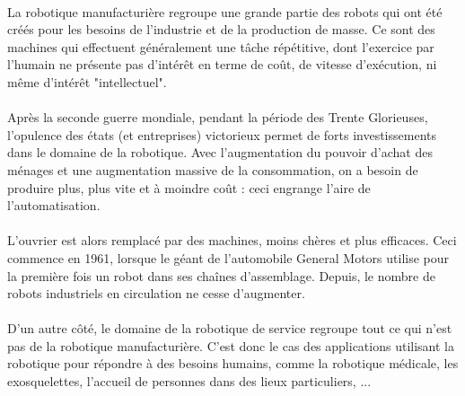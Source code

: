 \documentclass[a4paper,10pt]{article}
\begin{document}
            \paragraph{}
                La robotique manufacturière regroupe une grande partie des 
                robots qui ont été créés pour les besoins de l'industrie et de 
                la production de masse. Ce sont des machines qui effectuent 
                généralement une tâche répétitive, dont l'exercice par l'humain 
                ne présente pas d'intérêt en terme de coût, de vitesse d'exécution, 
                ni même d'intérêt "intellectuel". 
                
            \paragraph{}
                Après la seconde guerre mondiale, pendant la période des 
                Trente Glorieuses, l'opulence des états (et entreprises) victorieux
                permet de forts investissements dans le domaine de la robotique. 
                Avec l'augmentation du pouvoir d'achat des ménages et une augmentation
                massive de la consommation, on a besoin de produire plus, plus vite et 
                à moindre coût : ceci engrange l'aire de l'automatisation. 
                
            \paragraph{}
                L'ouvrier est alors remplacé par des machines, moins chères et plus efficaces.
                Ceci commence en 1961, lorsque le géant de l'automobile General Motors 
                utilise pour la première fois un robot dans ses chaînes d'assemblage.
                Depuis, le nombre de robots industriels en circulation ne cesse
                d'augmenter. 
                
            \paragraph{}
                D'un autre côté, le domaine de la robotique de service regroupe
                tout ce qui n'est pas de la robotique manufacturière. C'est donc 
                le cas des applications utilisant la robotique pour répondre à des 
                besoins humains, comme la robotique médicale, les exosquelettes, 
                l'accueil de personnes dans des lieux particuliers, ... 
                
\end{document}
